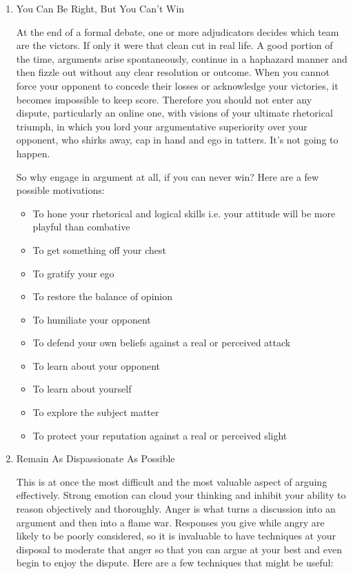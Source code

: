 \documentclass{article}
\begin{document}
\begin{enumerate}
\item You Can Be Right, But You Can't Win
\label{sec:orgheadline73}

At the end of a formal debate, one or more adjudicators decides which
team are the victors. If only it were that clean cut in real life. A
good portion of the time, arguments arise spontaneously, continue in a
haphazard manner and then fizzle out without any clear resolution or
outcome. When you cannot force your opponent to concede their losses or
acknowledge your victories, it becomes impossible to keep score.
Therefore you should not enter any dispute, particularly an online one,
with visions of your ultimate rhetorical triumph, in which you lord your
argumentative superiority over your opponent, who shirks away, cap in
hand and ego in tatters. It's not going to happen.

So why engage in argument at all, if you can never win? Here are a few
possible motivations:

\begin{itemize}
\item To hone your rhetorical and logical skills i.e. your attitude will be
more playful than combative
\item To get something off your chest
\item To gratify your ego
\item To restore the balance of opinion
\item To humiliate your opponent
\item To defend your own beliefs against a real or perceived attack
\item To learn about your opponent
\item To learn about yourself
\item To explore the subject matter
\item To protect your reputation against a real or perceived slight
\end{itemize}

\item Remain As Dispassionate As Possible
\label{sec:orgheadline74}

This is at once the most difficult and the most valuable aspect of
arguing effectively. Strong emotion can cloud your thinking and inhibit
your ability to reason objectively and thoroughly. Anger is what turns a
discussion into an argument and then into a flame war. Responses you
give while angry are likely to be poorly considered, so it is invaluable
to have techniques at your disposal to moderate that anger so that you
can argue at your best and even begin to enjoy the dispute. Here are a
few techniques that might be useful:


\end{enumerate}
\end{document}
